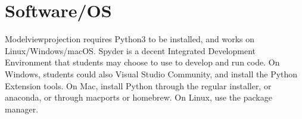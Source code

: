 \documentclass[11pt,twocolumn]{article}
\begin{document}
\section{Software/OS}


Modelviewprojection requires Python3 to be installed, and works on Linux/Windows/macOS. Spyder
is a decent Integrated Development Environment that students may choose to use to develop and
run code.
On Windows, students could also Visual Studio Community, and install the Python Extension tools.
On Mac, install Python through the regular installer, or anaconda, or through macports or homebrew.
On Linux, use the package manager.
\end{document}
